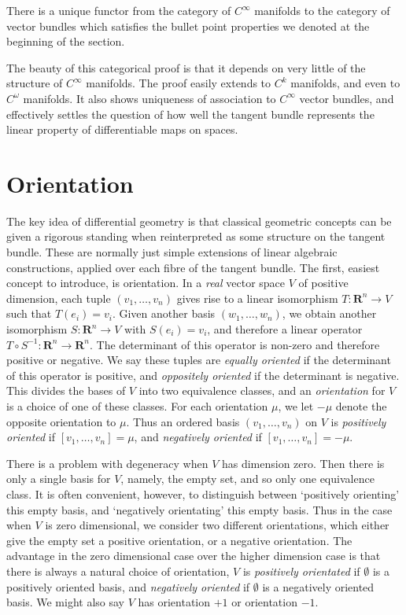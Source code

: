 \begin{theorem}
    There is a unique functor from the category of $C^\infty$ manifolds to the category of vector bundles which satisfies the bullet point properties we denoted at the beginning of the section.
\end{theorem}

The beauty of this categorical proof is that it depends on very little of the structure of $C^\infty$ manifolds. The proof easily extends to $C^k$ manifolds, and even to $C^\omega$ manifolds. It also shows uniqueness of association to $C^\infty$ vector bundles, and effectively settles the question of how well the tangent bundle represents the linear property of differentiable maps on spaces.

\section{Orientation}

The key idea of differential geometry is that classical geometric concepts can be given a rigorous standing when reinterpreted as some structure on the tangent bundle. These are normally just simple extensions of linear algebraic constructions, applied over each fibre of the tangent bundle. The first, easiest concept to introduce, is orientation. In a {\it real} vector space $V$ of positive dimension, each tuple $(v_1, \dots, v_n)$ gives rise to a linear isomorphism $T: \mathbf{R}^n \to V$ such that $T(e_i) = v_i$. Given another basis $(w_1, \dots, w_n)$, we obtain another isomorphism $S: \mathbf{R}^n \to V$ with $S(e_i) = v_i$, and therefore a linear operator $T \circ S^{-1}: \mathbf{R}^n \to \mathbf{R}^n$. The determinant of this operator is non-zero and therefore positive or negative. We say these tuples are {\it equally oriented} if the determinant of this operator is positive, and {\it oppositely oriented} if the determinant is negative. This divides the bases of $V$ into two equivalence classes, and an \emph{orientation} for $V$ is a choice of one of these classes. For each orientation $\mu$, we let $- \mu$ denote the opposite orientation to $\mu$. Thus an ordered basis $(v_1, \dots, v_n)$ on $V$ is \emph{positively oriented} if $[v_1, \dots, v_n] = \mu$, and \emph{negatively oriented} if $[v_1, \dots, v_n] = -\mu$.

\begin{remark}
    There is a problem with degeneracy when $V$ has dimension zero. Then there is only a single basis for $V$, namely, the empty set, and so only one equivalence class. It is often convenient, however, to distinguish between `positively orienting' this empty basis, and `negatively orientating' this empty basis. Thus in the case when $V$ is zero dimensional, we consider two different orientations, which either give the empty set a positive orientation, or a negative orientation. The advantage in the zero dimensional case over the higher dimension case is that there is always a natural choice of orientation, $V$ is \emph{positively orientated} if $\emptyset$ is a positively oriented basis, and \emph{negatively oriented} if $\emptyset$ is a negatively oriented basis. We might also say $V$ has orientation $+1$ or orientation $-1$.
\end{remark}


